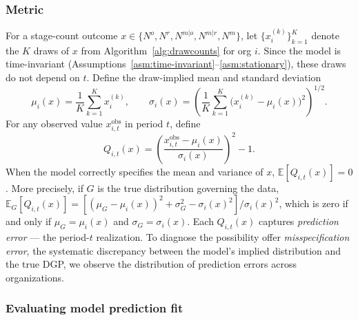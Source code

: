 \documentclass[source/paper/main.tex]{subfiles}
\begin{document}
\subsubsection{Metric}
\label{sec:metric}

For a stage-count outcome $x \in \{N^o, N^r, N^{m|o}, N^{m|r}, N^m\}$, let $\{x_i^{(k)}\}_{k=1}^K$ denote the $K$ draws of $x$ from Algorithm~\ref{alg:drawcounts} for org $i$.
Since the model is time-invariant (Assumptions~\ref{asm:time-invariant}--\ref{asm:stationary}), these draws do not depend on $t$.
Define the draw-implied mean and standard deviation
$$\mu_i(x) = \frac{1}{K}\sum_{k=1}^K x_i^{(k)}, \qquad \sigma_i(x) = \left(\frac{1}{K}\sum_{k=1}^K \bigl(x_i^{(k)} - \mu_i(x)\bigr)^2\right)^{1/2}.$$
For any observed value $x_{i,t}^{\mathrm{obs}}$ in period $t$, define
$$Q_{i,t}(x) = \left(\frac{x_{i,t}^{\mathrm{obs}} - \mu_i(x)}{\sigma_i(x)}\right)^2 - 1.$$
When the model correctly specifies the mean and variance of $x$, $\mathbb{E}[Q_{i,t}(x)] = 0$.
More precisely, if $G$ is the true distribution governing the data, $\mathbb{E}_G[Q_{i,t}(x)] = [(\mu_G - \mu_i(x))^2 + \sigma_G^2 - \sigma_i(x)^2]/\sigma_i(x)^2$, which is zero if and only if $\mu_G = \mu_i(x)$ and $\sigma_G = \sigma_i(x)$.
Each $Q_{i,t}(x)$ captures \emph{prediction error} --- the period-$t$ realization.
To diagnose the possibility offer \emph{misspecification error}, the systematic discrepancy between the model's implied distribution and the true DGP, we observe the distribution of prediction errors across organizations.

\subsubsection{Evaluating model prediction fit}
\label{sec:simulated-null}
\end{document}
